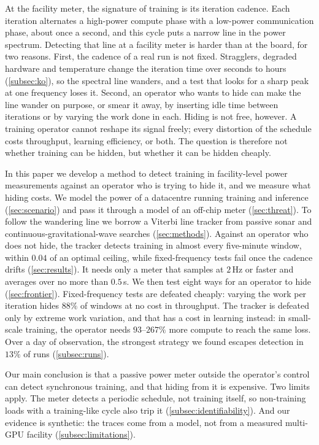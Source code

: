 \documentclass{article}
\begin{document}
At the facility meter, the signature of training is its iteration cadence. Each
iteration alternates a high-power compute phase with a low-power communication
phase, about once a second, and this cycle puts a narrow line in the power
spectrum. Detecting that line at a facility meter is harder than at the board,
for two reasons. First, the cadence of a real run is not fixed. Stragglers, degraded
hardware and temperature change the iteration time over seconds to hours
(\cref{subsec:ko}), so the spectral line wanders, and a test that looks for a
sharp peak at one frequency loses it. Second, an operator who wants to hide can
make the line wander on purpose, or smear it away, by inserting idle time
between iterations or by varying the work done in each. Hiding is not free,
however. A training operator cannot reshape its
signal freely; every distortion of the schedule costs throughput, learning
efficiency, or both. The question is therefore not whether training can be
hidden, but whether it can be hidden cheaply.

In this paper we develop a method to detect training in facility-level power
measurements against an operator who is trying to hide it, and we measure what
hiding costs. We model the power of a datacentre running training and inference
(\cref{sec:scenario}) and pass it through a model of an off-chip meter
(\cref{sec:threat}). To follow the wandering line we borrow a Viterbi line
tracker from passive sonar and continuous-gravitational-wave searches
(\cref{sec:methods}). Against an operator who does not hide, the tracker detects
training in almost every five-minute window, within $0.04$ of an optimal
ceiling, while fixed-frequency tests fail once the cadence drifts
(\cref{sec:results}). It needs only a meter that samples at $2$\,Hz or faster
and averages over no more than $0.5$\,s. We then test eight ways for an operator
to hide (\cref{sec:frontier}). Fixed-frequency tests are defeated cheaply:
varying the work per iteration hides $88\%$ of windows at no cost in throughput.
The tracker is defeated only by extreme work variation, and that has a cost in
learning instead: in small-scale training, the operator needs $93$--$267\%$ more
compute to reach the same loss. Over a day of observation, the strongest
strategy we found escapes detection in $13\%$ of runs (\cref{subsec:runs}).

Our main conclusion is that a passive power meter outside the operator's control
can detect synchronous training, and that hiding from it is expensive. Two
limits apply. The meter detects a periodic schedule, not training itself, so
non-training loads with a training-like cycle also trip it
(\cref{subsec:identifiability}). And our evidence is synthetic: the traces come
from a model, not from a measured multi-GPU facility
(\cref{subsec:limitations}).
\end{document}
